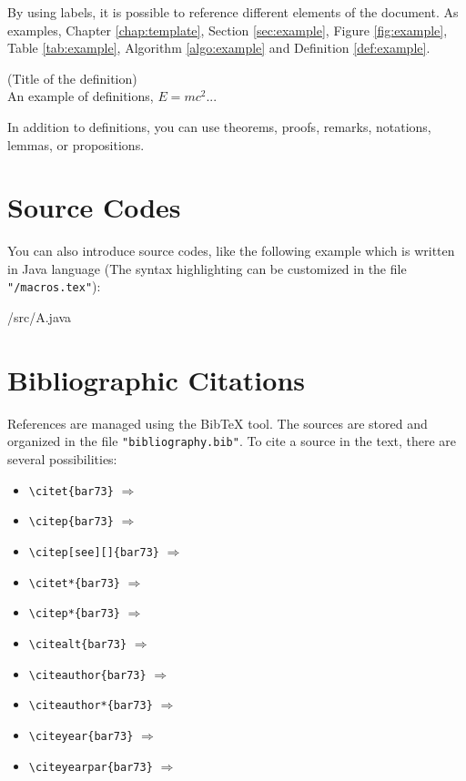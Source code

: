 By using labels, it is possible to reference different elements of the document. As examples, Chapter \ref{chap:template}, Section \ref{sec:example}, Figure \ref{fig:example}, Table \ref{tab:example}, Algorithm \ref{algo:example} and Definition \ref{def:example}.


\begin{definition} \label{def:example}
	(Title of the definition)\\
	An example of definitions, $E=mc^2$...
\end{definition}

In addition to definitions, you can use theorems, proofs, remarks, notations, lemmas, or propositions.

\section{Source Codes}

You can also introduce source codes, like the following example which is written in Java language (The syntax highlighting can be customized in the file \texttt{"/macros.tex"}):

\begin{sourcecode}{/src/A.java}
	
\end{sourcecode}

\section{Bibliographic Citations}

References are managed using the Bib\TeX{} tool. The sources are stored and organized in the file \texttt{"bibliography.bib"}. To cite a source in the text, there are several possibilities:

\begin{itemize}
	\item \verb|\citet{bar73}| \quad $\Rightarrow$ \quad \citet{bar73} %
		\item \verb|\citep{bar73}| \quad $\Rightarrow$ \quad \citep{bar73} %
	\item \verb|\citep[see][]{bar73}| \quad $\Rightarrow$ \quad \citep[see][]{bar73} %
	\item \verb|\citet*{bar73}| \quad $\Rightarrow$ \quad \citet*{bar73} %
	\item \verb|\citep*{bar73}| \quad $\Rightarrow$ \quad \citep*{bar73} %
	\item \verb|\citealt{bar73}| \quad $\Rightarrow$ \quad \citealt{bar73} %
	\item \verb|\citeauthor{bar73}| \quad $\Rightarrow$ \quad \citeauthor{bar73} %
	\item \verb|\citeauthor*{bar73}| \quad $\Rightarrow$ \quad \citeauthor*{bar73} %
	\item \verb|\citeyear{bar73}| \quad $\Rightarrow$ \quad \citeyear{bar73} %
	\item \verb|\citeyearpar{bar73}| \quad $\Rightarrow$ \quad \citeyearpar{bar73} %
\end{itemize}